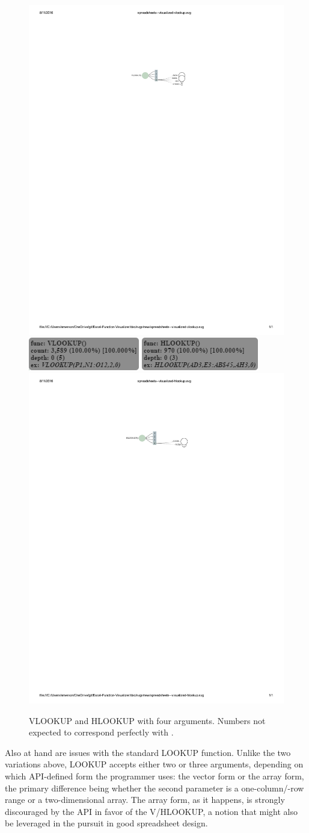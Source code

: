 \documentclass[conference]{IEEEtran}
\begin{document}
	\begin{figure}[h] \centering \includegraphics[width=.5\textwidth]{vlookup}
		\includegraphics[width=.225\textwidth]{vlookupbox}
		\includegraphics[width=.225\textwidth]{hlookupbox}
		\includegraphics[width=.5\textwidth]{hlookup} \label{fig:vhlookups}
		\caption{VLOOKUP and HLOOKUP with four arguments. Numbers not expected to
			correspond perfectly with \cite{hermans2015detecting}.} \end{figure}
	
	Also at hand are issues with the standard LOOKUP function. Unlike the two
	variations above, LOOKUP accepts either two or three arguments, depending on
	which API-defined form the programmer uses: the vector form or the array form,
	the primary difference being whether the second parameter is a one-column/-row
	range or a two-dimensional array. The array form, as it happens, is strongly
	discouraged by the API in favor of the V/HLOOKUP, a notion that might also be
	leveraged in the pursuit in good spreadsheet design.
	
\end{document}

